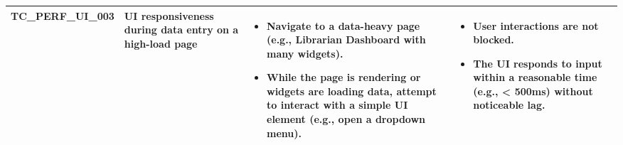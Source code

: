 \begin{longtable}{|>{\scriptsize\raggedright\arraybackslash}p{3.5cm}|>{\raggedright\arraybackslash}p{3cm}|>{\raggedright\arraybackslash}p{4cm}|>{\raggedright\arraybackslash}p{4.5cm}|}
TC\_PERF\_UI\_003 & UI responsiveness during data entry on a high-load page & 
    \begin{itemize}[noitemsep, topsep=0pt, partopsep=0pt, leftmargin=*]
        \item Navigate to a data-heavy page (e.g., Librarian Dashboard with many widgets).
        \item While the page is rendering or widgets are loading data, attempt to interact with a simple UI element (e.g., open a dropdown menu).
    \end{itemize} & 
    \begin{itemize}[noitemsep, topsep=0pt, partopsep=0pt, leftmargin=*]
        \item User interactions are not blocked.
        \item The UI responds to input within a reasonable time (e.g., < 500ms) without noticeable lag.
    \end{itemize} \\ \hline


\end{longtable}
